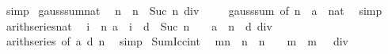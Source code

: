 \begin{isabellebody}
\ simp%
\endisatagproof
{\isafoldproof}%
%
\isadelimproof
\isanewline
%
\endisadelimproof
\isanewline
{}\isamarkupfalse%
\isanewline
\isanewline
{}\isamarkupfalse%
\ gauss{\isacharunderscore}{\kern0pt}sum{\isacharunderscore}{\kern0pt}nat{\isacharcolon}{\kern0pt}\isanewline
\ \ {\isachardoublequoteopen}{\isasymSum}{\isacharbraceleft}{\kern0pt}{}{\isachardot}{\kern0pt}{\isachardot}{\kern0pt}n{\isacharbraceright}{\kern0pt}\ {\isacharequal}{\kern0pt}\ {\isacharparenleft}{\kern0pt}n\ {\isacharasterisk}{\kern0pt}\ Suc\ n{\isacharparenright}{\kern0pt}\ div\ {}{\isachardoublequoteclose}\isanewline
%
\isadelimproof
\ \ %
\endisadelimproof
%
\isatagproof
{}\isamarkupfalse%
\ gauss{\isacharunderscore}{\kern0pt}sum\ {\isacharbrackleft}{\kern0pt}of\ n{\isacharcomma}{\kern0pt}\ \ {\isacharquery}{\kern0pt}{\isacharprime}{\kern0pt}a\ {\isacharequal}{\kern0pt}\ nat{\isacharbrackright}{\kern0pt}\ \isamarkupfalse%
\ simp%
\endisatagproof
{\isafoldproof}%
%
\isadelimproof
\isanewline
%
\endisadelimproof
\isanewline
{}\isamarkupfalse%
\ arith{\isacharunderscore}{\kern0pt}series{\isacharunderscore}{\kern0pt}nat{\isacharcolon}{\kern0pt}\isanewline
\ \ {\isachardoublequoteopen}{\isacharparenleft}{\kern0pt}{\isasymSum}i\ {\isacharequal}{\kern0pt}\ {}{\isachardot}{\kern0pt}{\isachardot}{\kern0pt}n{\isachardot}{\kern0pt}\ a\ {\isacharplus}{\kern0pt}\ i\ {\isacharasterisk}{\kern0pt}\ d{\isacharparenright}{\kern0pt}\ {\isacharequal}{\kern0pt}\ Suc\ n\ {\isacharasterisk}{\kern0pt}\ {\isacharparenleft}{\kern0pt}{}\ {\isacharasterisk}{\kern0pt}\ a\ {\isacharplus}{\kern0pt}\ n\ {\isacharasterisk}{\kern0pt}\ d{\isacharparenright}{\kern0pt}\ div\ {}{\isachardoublequoteclose}\isanewline
%
\isadelimproof
\ \ %
\endisadelimproof
%
\isatagproof
{}\isamarkupfalse%
\ arith{\isacharunderscore}{\kern0pt}series\ {\isacharbrackleft}{\kern0pt}of\ a\ d\ n{\isacharbrackright}{\kern0pt}\ \isamarkupfalse%
\ simp%
\endisatagproof
{\isafoldproof}%
%
\isadelimproof
\isanewline
%
\endisadelimproof
\isanewline
{}\isamarkupfalse%
\ Sum{\isacharunderscore}{\kern0pt}Icc{\isacharunderscore}{\kern0pt}int{\isacharcolon}{\kern0pt}\isanewline
\ \ {\isachardoublequoteopen}{\isasymSum}{\isacharbraceleft}{\kern0pt}m{\isachardot}{\kern0pt}{\isachardot}{\kern0pt}n{\isacharbraceright}{\kern0pt}\ {\isacharequal}{\kern0pt}\ {\isacharparenleft}{\kern0pt}n\ {\isacharasterisk}{\kern0pt}\ {\isacharparenleft}{\kern0pt}n\ {\isacharplus}{\kern0pt}\ {}{\isacharparenright}{\kern0pt}\ {\isacharminus}{\kern0pt}\ m\ {\isacharasterisk}{\kern0pt}\ {\isacharparenleft}{\kern0pt}m\ {\isacharminus}{\kern0pt}\ {}{\isacharparenright}{\kern0pt}{\isacharparenright}{\kern0pt}\ div\ {}{\isachardoublequoteclose}\isanewline

\end{isabellebody}
